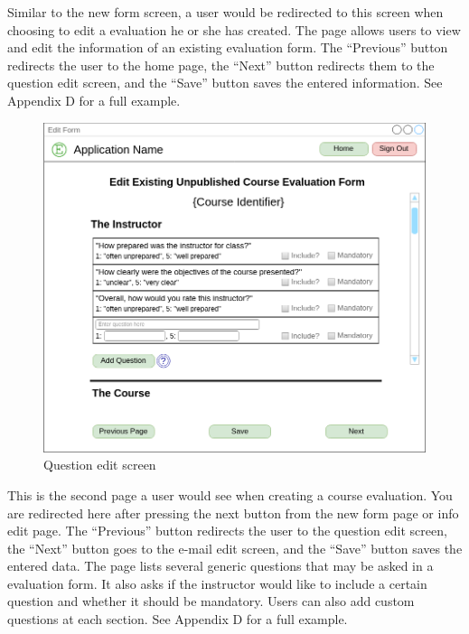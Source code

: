 \documentclass{article}
\begin{document}
Similar to the new form screen, a user would be redirected to this screen when choosing to edit a evaluation he or she has created. The page allows users to view and edit the information of an existing evaluation form.  The ``Previous'' button redirects the user to the home page, the ``Next'' button redirects them to the question edit screen, and the ``Save'' button saves the entered information. See Appendix D for a full example.

\newpage

\begin{center}
\begin{figure}[H]
    \centering
    \caption{Question edit screen}
    \includegraphics[width=6.5in]{images/questions_screen.png}
\end{figure}
\end{center}

This is the second page a user would see when creating a course evaluation. You are redirected here after pressing the next button from the new form page or info edit page.  The ``Previous'' button redirects the user to the question edit screen, the ``Next'' button goes to the e-mail edit screen, and the ``Save'' button saves the entered data. The page lists several generic questions that may be asked in a evaluation form. It also asks if the instructor would like to include a certain question and whether it should be mandatory. Users can also add custom questions at each section. See Appendix D for a full example.
\end{document}

